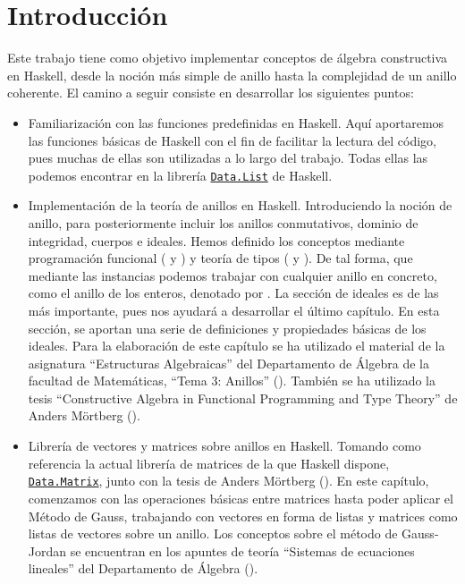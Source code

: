 \label{sec:introHas}
\chapter*{Introducción}

Este trabajo tiene como objetivo implementar conceptos de álgebra constructiva en Haskell, desde la noción más simple de anillo hasta la complejidad de un anillo coherente. El camino a seguir consiste en desarrollar los siguientes puntos:
\begin{itemize}
\item Familiarización con las funciones predefinidas en Haskell. Aquí aportaremos las funciones básicas de Haskell con el fin de facilitar la lectura del código, pues muchas de ellas son utilizadas a lo largo del trabajo. Todas ellas las podemos encontrar en la librería \href{http://hackage.haskell.org/package/base-4.11.1.0/docs/Data-List.html}{\texttt{Data.List}}  de Haskell.

\item Implementación de la teoría de anillos en Haskell. Introduciendo la noción de anillo, para posteriormente incluir los anillos conmutativos, dominio de integridad, cuerpos e ideales. Hemos definido los conceptos mediante programación funcional (\cite{Alonso-15b} y \cite{Hutton-16}) y teoría de tipos (\cite{Alonso-16a} y \cite{aprendehaskell}). De tal forma, que mediante las instancias podemos trabajar con cualquier anillo en concreto, como el anillo de los enteros, denotado por . La sección de ideales es de las más importante, pues nos ayudará a desarrollar el último capítulo. En esta sección, se aportan una serie de definiciones y propiedades básicas de los ideales. Para la elaboración de este capítulo se ha utilizado el material de la asignatura ``Estructuras Algebraicas'' del Departamento de Álgebra de la facultad de Matemáticas, ``Tema 3: Anillos'' (\cite{Algebra-15}). También se ha utilizado la tesis ``Constructive Algebra in Functional Programming and Type Theory'' de Anders Mörtberg (\cite{tesis}).

\item Librería de vectores y matrices sobre anillos en Haskell. Tomando como referencia la actual librería de matrices de la que Haskell dispone, \href{https://hackage.haskell.org/package/matrix-0.3.6.1/docs/Data-Matrix.html}{\texttt{Data.Matrix}}, junto con la tesis de Anders Mörtberg (\cite{tesis}). En este capítulo, comenzamos con las operaciones básicas entre matrices hasta poder aplicar el Método de Gauss, trabajando con vectores en forma de listas y matrices como listas de vectores sobre un anillo. Los conceptos sobre el método de Gauss-Jordan se encuentran en los apuntes de teoría ``Sistemas de ecuaciones lineales'' del Departamento de Álgebra (\cite{gauss}).


\end{itemize}
